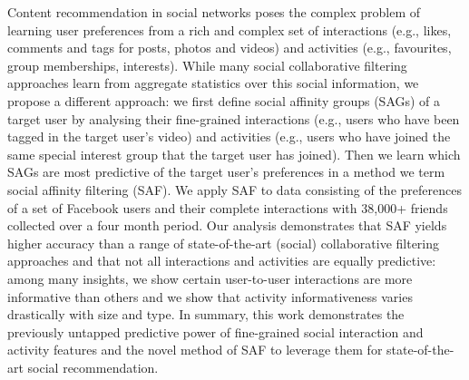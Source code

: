Content recommendation in social networks poses the complex problem of
learning user preferences from a rich and complex set of interactions
(e.g., likes, comments and tags for posts, photos and videos) and
activities (e.g., favourites, group memberships, interests).  While
many social collaborative filtering approaches learn from aggregate statistics over this
social information, we propose a different approach: we first define
social affinity groups (SAGs) of a target user by analysing their
fine-grained interactions (e.g., users who have been tagged in the
target user's video) and activities (e.g., users who have joined the
same special interest group that the target user has joined).  Then we
learn which SAGs are most predictive of the target user's preferences
in a method we term social affinity filtering (SAF).  We apply SAF to
data consisting of the preferences of a set of Facebook users and their
complete interactions with 38,000+ friends collected over a four month
period.  Our analysis demonstrates that SAF yields higher accuracy
than a range of state-of-the-art (social) collaborative filtering approaches and that not all
interactions and activities are equally predictive: among many insights, 
we show certain user-to-user interactions are more
informative than others %
and we show that activity informativeness varies drastically with size
and type.  In summary, this work demonstrates the previously untapped
predictive power of fine-grained social interaction and activity
features and the novel method of SAF to leverage them for
state-of-the-art social recommendation.

